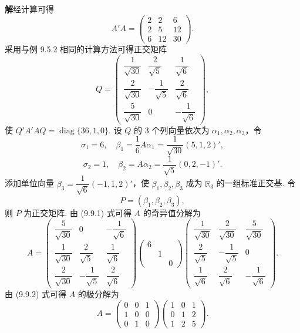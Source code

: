 \documentclass[UTF8, 12pt, fontset=fandol, oneside]{ctexart}
\begin{document}
\noindent\textbf{解}\quad 经计算可得
\[
  A'A=
  \left(\begin{array}{ccc}
    2 & 2 & 6\\
    2 & 5 & 12\\
    6 & 12 & 30
  \end{array}\right).
\]
采用与例 9.5.2 相同的计算方法可得正交矩阵
\[
  Q=
  \left(\begin{array}{ccc}
    \dfrac1{\sqrt{30}} & \dfrac2{\sqrt5} & \dfrac1{\sqrt6}\\
    \dfrac2{\sqrt{30}} & -\dfrac1{\sqrt5} & \dfrac2{\sqrt6}\\
    \dfrac5{\sqrt{30}} & 0 & -\dfrac1{\sqrt6}
  \end{array}\right),
\]
使 $Q'A'AQ=\operatorname{diag}\{36,1,0\}$. 设 $Q$ 的 $3$ 个列向量依次为 $\alpha_1,\alpha_2,\alpha_3$，令
\[
  \sigma_1=6,\quad \beta_1=\frac16A\alpha_1=\frac1{\sqrt{30}}(5,1,2)',
\]
\[
  \sigma_2=1,\quad \beta_2=A\alpha_2=\frac1{\sqrt5}(0,2,-1)'.
\]
添加单位向量 $\beta_3=\dfrac1{\sqrt6}(-1,1,2)'$，使 $\beta_1,\beta_2,\beta_3$ 成为 $\mathbb R_3$ 的一组标准正交基. 令
\[
  P=(\beta_1,\beta_2,\beta_3),
\]
则 $P$ 为正交矩阵. 由 (9.9.1) 式可得 $A$ 的奇异值分解为
\[
  A=
  \left(\begin{array}{ccc}
    \dfrac5{\sqrt{30}} & 0 & -\dfrac1{\sqrt6}\\
    \dfrac1{\sqrt{30}} & \dfrac2{\sqrt5} & \dfrac1{\sqrt6}\\
    \dfrac2{\sqrt{30}} & -\dfrac1{\sqrt5} & \dfrac2{\sqrt6}
  \end{array}\right)
  \left(\begin{array}{ccc}
    6 & &\\
    & 1 &\\
    & & 0
  \end{array}\right)
  \left(\begin{array}{ccc}
    \dfrac1{\sqrt{30}} & \dfrac2{\sqrt{30}} & \dfrac5{\sqrt{30}}\\
    \dfrac2{\sqrt5} & -\dfrac1{\sqrt5} & 0\\
    \dfrac1{\sqrt6} & \dfrac2{\sqrt6} & -\dfrac1{\sqrt6}
  \end{array}\right).
\]
由 (9.9.2) 式可得 $A$ 的极分解为
\[
  A=
  \left(\begin{array}{ccc}
    0 & 0 & 1\\
    1 & 0 & 0\\
    0 & 1 & 0
  \end{array}\right)
  \left(\begin{array}{ccc}
    1 & 0 & 1\\
    0 & 1 & 2\\
    1 & 2 & 5
  \end{array}\right).
\]
\end{document}
